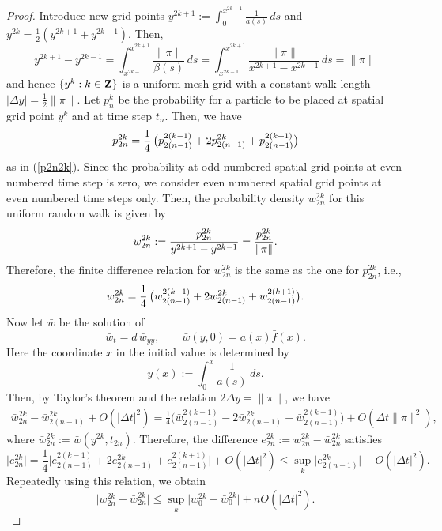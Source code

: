 \documentclass[11pt]{amsart}
\def\d{d}
\def\Z{{\bf Z}}
\begin{document}
\begin{proof}
Introduce new grid points $y^{2k+1}:=\int_0^{x^{2k+1}} \frac{1}{a(s)}\,ds$ and $y^{2k}=\frac{1}{2}(y^{2k+1}+y^{2k-1})$. Then,
\[
y^{2k+1}-y^{2k-1} =\int_{x^{2k-1}}^{x^{2k+1}}\frac{\|\pi\|}{\beta(s)}\,ds =\int_{x^{2k-1}}^{x^{2k+1}}\frac{\|\pi\|}{x^{2k+1}-x^{2k-1}}\,ds  =\|\pi\|
\]
and hence $\{y^k:k\in\Z\}$ is a uniform mesh grid with a constant walk length $|\Delta y|=\frac{1}{2}\|\pi\|$. Let $p_n^k$ be the probability for a particle to be placed at spatial grid point $y^k$ and at time step $t_n$. Then, we have
\[
p^{2k}_{2n} ={1\over 4}\, \big( p^{2(k-1)}_{2(n-1)} +2p^{2k}_{2(n-1)} +p^{2(k+1)}_{2(n-1)} \big)
\]
as in (\ref{p2n2k}). Since the probability at odd numbered spatial grid points at even numbered time step is zero, we consider even numbered spatial grid points at even numbered time steps only. Then, the probability density $w^{2k}_{2n}$ for this uniform random walk is given by
\[
w^{2k}_{2n}:={p^{2k}_{2n}\over y^{2k+1}-y^{2k-1}} = \frac{p^{2k}_{2n}}{ \|\pi\| }.
\]
Therefore, the finite difference relation for $w^{2k}_{2n}$ is the same as the one for $p^{2k}_{2n}$, i.e.,
\[
w^{2k}_{2n} ={1\over 4}\, \big( w^{2(k-1)}_{2(n-1)} +2w^{2k}_{2(n-1)} +w^{2(k+1)}_{2(n-1)} \big).
\]
Now let $\bar w$ be the solution of
\begin{equation} \label{barw}
\bar w_t =\d\,\bar w_{yy},\qquad\bar w(y,0) =a(x)\bar f(x).
\end{equation}
Here the coordinate $x$ in the initial value is determined by
\begin{equation} \label{relation-y(x)}
y(x):=\int_0^x \frac{1}{a(s)}\,ds.
\end{equation}
Then, by Taylor's theorem and the relation $2\Delta y=\|\pi\|$, we have
\[\begin{split}
\bar{w}^{2k}_{2n} -\bar{w}^{2k}_{2(n-1)} +O(|\Delta t|^2)
=\frac{1}{4} \big( \bar{w}^{2(k-1)}_{2(n-1)} -2\bar{w}^{2k}_{2(n-1)} + \bar{w}^{2(k+1)}_{2(n-1)} \big) +O(\Delta t\|\pi\|^{2}),
\end{split}\]
where $\bar{w}^{2k}_{2n}:=\bar{w}(y^{2k},t_{2n})$. Therefore, the difference $e^{2k}_{2n}:=w^{2k}_{2n}-\bar{w}^{2k}_{2n}$ satisfies
\[
\big| e^{2k}_{2n} \big| = \frac{1}{4} \big| e^{2(k-1)}_{2(n-1)} +2e^{2k}_{2(n-1)} +e^{2(k+1)}_{2(n-1)} \big| +O(|\Delta t|^2)\leq \sup_k \big| e^{2k}_{2(n-1)} \big| + O(|\Delta t|^2).
\]
Repeatedly using this relation, we obtain
\begin{equation} \label{error-between-w's}
\big| w^{2k}_{2n}-\bar{w}^{2k}_{2n} \big| \leq \sup_k \big| w^{2k}_0-\bar{w}^{2k}_0 \big| + nO(|\Delta t|^2).
\end{equation}


\end{proof}
\end{document}

